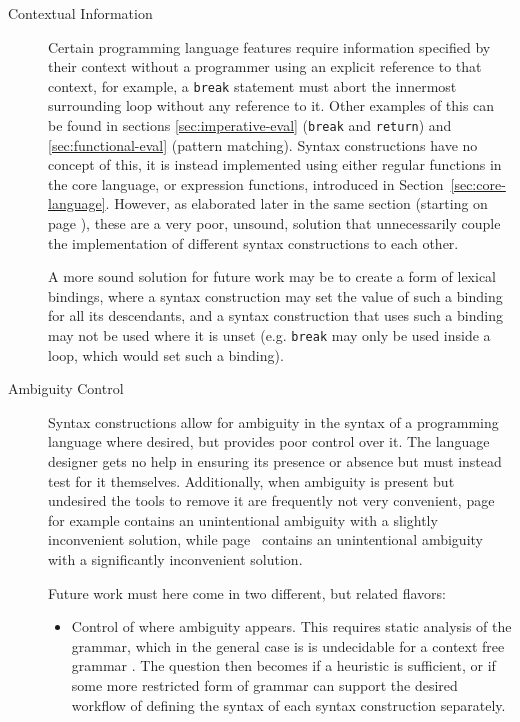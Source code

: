 \documentclass{kththesis}
\begin{document}
\begin{description}
  \item[Contextual Information] Certain programming language features require information specified by their context without a programmer using an explicit reference to that context, for example, a \texttt{break} statement must abort the innermost surrounding loop without any reference to it. Other examples of this can be found in sections \ref{sec:imperative-eval} (\texttt{break} and \texttt{return}) and \ref{sec:functional-eval} (pattern matching). Syntax constructions have no concept of this, it is instead implemented using either regular functions in the core language, or expression functions, introduced in Section~\ref{sec:core-language}. However, as elaborated later in the same section (starting on page \pageref{sec:efun-drawbacks}), these are a very poor, unsound, solution that unnecessarily couple the implementation of different syntax constructions to each other.

  A more sound solution for future work may be to create a form of lexical bindings, where a syntax construction may set the value of such a binding for all its descendants, and a syntax construction that uses such a binding may not be used where it is unset (e.g. \texttt{break} may only be used inside a loop, which would set such a binding).

  \item[Ambiguity Control] Syntax constructions allow for ambiguity in the syntax of a programming language where desired, but provides poor control over it. The language designer gets no help in ensuring its presence or absence but must instead test for it themselves. Additionally, when ambiguity is present but undesired the tools to remove it are frequently not very convenient, page~\pageref{sec:lua-func-call-precedence} for example contains an unintentional ambiguity with a slightly inconvenient solution, while page~\pageref{sec:ambiguous-lists} contains an unintentional ambiguity with a significantly inconvenient solution.

  Future work must here come in two different, but related flavors:
  \begin{itemize}
    \item Control of where ambiguity appears. This requires static analysis of the grammar, which in the general case is is undecidable for a context free grammar \cite{Cantor1962On-The-Ambiguit}. The question then becomes if a heuristic is sufficient, or if some more restricted form of grammar can support the desired workflow of defining the syntax of each syntax construction separately.


\end{itemize}
\end{description}
\end{document}
